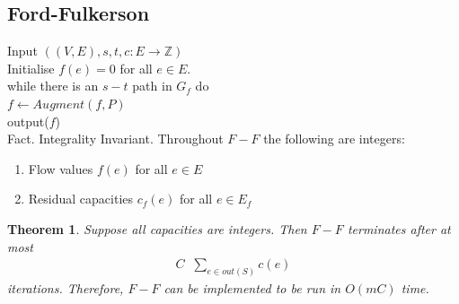 \documentclass[a4paper]{article}
\theoremstyle{plain}
\newtheorem{thm}{Theorem}[section]
\newcommand*{\MyDef}{\mathrm{def}}
\newcommand*{\eqdef}{\ensuremath{\mathop{\overset{\MyDef}{=}}}}
\theoremstyle{definition}
\theoremstyle{remark}
\begin{document}
	\subsection{Ford-Fulkerson}
	Input $((V,E),s,t,c : E \to \mathbb{Z})$\\
	Initialise $f(e) = 0$ for all $e \in E$. \\
	while there is an $s-t$ path in $G_f$ do\\
	$f \leftarrow Augment(f,P)$ \\
	output($f$)		\\		
	Fact. Integrality Invariant. Throughout $F-F$ the following are integers:
	\begin{enumerate}
		\item Flow values $f(e)$ for all $e \in E$ 
		\item Residual capacities $c_f(e)$ for all $e \in E_f$
	\end{enumerate}
	\begin{thm}
		Suppose all capacities are integers. Then $F-F$ terminates after at most 
		\begin{align*}
			C \eqdef \sum_{e \in out(S)}^{} c(e)
		\end{align*}
		iterations. Therefore, $F-F$ can be implemented to be run in $O(mC)$ time.
	\end{thm}
\end{document}
